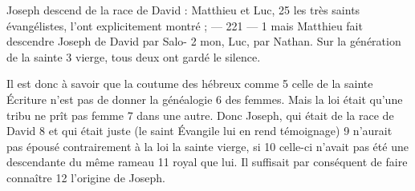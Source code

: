 Joseph descend de la race de David : Matthieu et Luc,	 
25	 	les très saints évangélistes, l'ont explicitement montré ;	 
 	--- 221 ---	 
1	 	mais Matthieu fait descendre Joseph de David par Salo-	 
2	 	mon, Luc, par Nathan. Sur la génération de la sainte	 
3	 	vierge, tous deux ont gardé le silence.

Il est donc à savoir que la coutume des hébreux comme	 
5	 	celle de la sainte Écriture n'est pas de donner la généalogie	 
6	 	des femmes. Mais la loi était qu'une tribu ne prît pas femme	 
7	 	dans une autre. Donc Joseph, qui était de la race de David	 
8	 	et qui était juste (le saint Évangile lui en rend témoignage)	 
9	 	n'aurait pas épousé contrairement à la loi la sainte vierge, si	 
10	 	celle-ci n'avait pas été une descendante du même rameau	 
11	 	royal que lui. Il suffisait par conséquent de faire connaître	 
12	 	l'origine de Joseph.